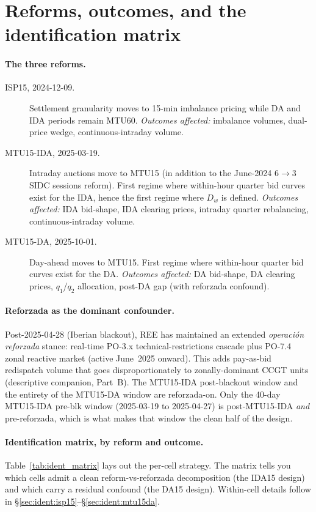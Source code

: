 \documentclass[11pt,a4paper]{article}
\begin{document}
\section{Reforms, outcomes, and the identification matrix}\label{sec:ident:matrix}

\paragraph{The three reforms.}
\begin{description}
\item[ISP15, 2024-12-09.] Settlement granularity moves to 15-min imbalance pricing while DA and IDA periods remain MTU60. \emph{Outcomes affected:} imbalance volumes, dual-price wedge, continuous-intraday volume.
\item[MTU15-IDA, 2025-03-19.] Intraday auctions move to MTU15 (in addition to the June-2024 6$\to$3 SIDC sessions reform). First regime where within-hour quarter bid curves exist for the IDA, hence the first regime where $D_w$ is defined. \emph{Outcomes affected:} IDA bid-shape, IDA clearing prices, intraday quarter rebalancing, continuous-intraday volume.
\item[MTU15-DA, 2025-10-01.] Day-ahead moves to MTU15. First regime where within-hour quarter bid curves exist for the DA. \emph{Outcomes affected:} DA bid-shape, DA clearing prices, $q_1$/$q_2$ allocation, post-DA gap (with reforzada confound).
\end{description}

\paragraph{Reforzada as the dominant confounder.} Post-2025-04-28 (Iberian blackout), REE has maintained an extended \emph{operaci\'on reforzada} stance: real-time PO-3.x technical-restrictions cascade plus PO-7.4 zonal reactive market (active June~2025 onward). This adds pay-as-bid redispatch volume that goes disproportionately to zonally-dominant CCGT units (descriptive companion, Part~B). The MTU15-IDA post-blackout window and the entirety of the MTU15-DA window are reforzada-on. Only the 40-day MTU15-IDA pre-blk window (2025-03-19 to 2025-04-27) is post-MTU15-IDA \emph{and} pre-reforzada, which is what makes that window the clean half of the design.

\paragraph{Identification matrix, by reform and outcome.} Table~\ref{tab:ident_matrix} lays out the per-cell strategy. The matrix tells you which cells admit a clean reform-vs-reforzada decomposition (the IDA15 design) and which carry a residual confound (the DA15 design). Within-cell details follow in \S\ref{sec:ident:isp15}--\S\ref{sec:ident:mtu15da}.
\end{document}
